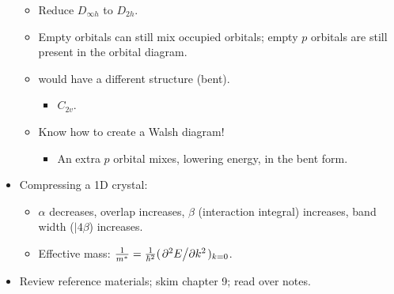 \documentclass[../notes.tex]{subfiles}
\begin{document}
\begin{itemize}
    \begin{itemize}
        \item Reduce $D_{\infty h}$ to $D_{2h}$.
        \item Empty orbitals can still mix occupied orbitals; empty $p$ orbitals are still present in the orbital diagram.
        \item {} would have a different structure (bent).
        \begin{itemize}
            \item $C_{2v}$.
        \end{itemize}
        \item Know how to create a Walsh diagram!
        \begin{itemize}
            \item An extra $p$ orbital mixes, lowering energy, in the bent form.
        \end{itemize}
    \end{itemize}
    \item Compressing a 1D crystal:
    \begin{itemize}
        \item $\alpha$ decreases, overlap increases, $\beta$ (interaction integral) increases, band width ($|4\beta$) increases.
        \item Effective mass: $\frac{1}{m^*}=\frac{1}{\hbar^2}(\pdv*[2]{E}{k})_{k=0}$.
    \end{itemize}
    \item Review reference materials; skim chapter 9; read over notes.
\end{itemize}
\end{document}
